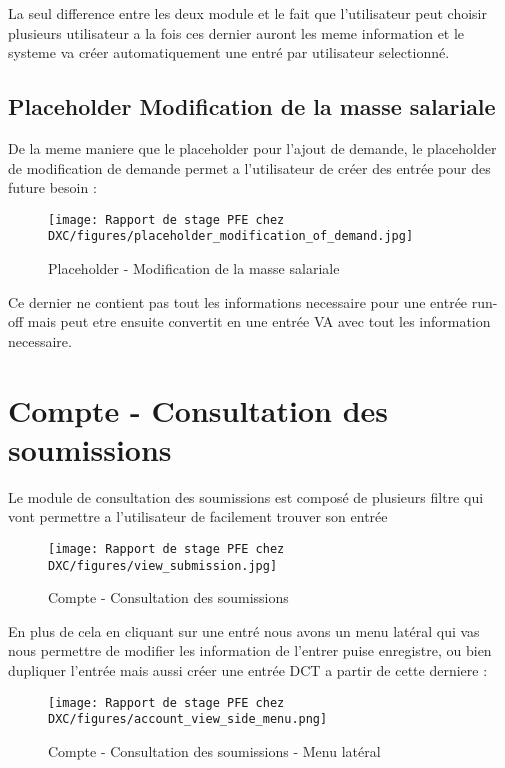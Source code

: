 La seul difference entre les deux module et le fait que l'utilisateur peut choisir plusieurs utilisateur a la fois ces dernier auront les meme information et le systeme va créer automatiquement une entré par utilisateur selectionné.

\newpage

\subsection{Placeholder Modification de la masse salariale}

De la meme maniere que le placeholder pour l'ajout de demande, le placeholder de modification de demande permet a l'utilisateur de créer des entrée pour des future besoin :

\begin{figure}[H]
    \centering
    \texttt{[image: Rapport de stage PFE chez DXC/figures/placeholder\_modification\_of\_demand.jpg]}
    \caption{Placeholder - Modification de la masse salariale}
\end{figure}

Ce dernier ne contient pas tout les informations necessaire pour une entrée run-off mais peut etre ensuite convertit en une entrée VA avec tout les information necessaire.

\newpage
\section{Compte - Consultation des soumissions}

Le module de consultation des soumissions est composé de plusieurs filtre qui vont permettre a l'utilisateur de facilement trouver son entrée 

\begin{figure}[H]
    \centering
    \texttt{[image: Rapport de stage PFE chez DXC/figures/view\_submission.jpg]}
    \caption{Compte - Consultation des soumissions}
\end{figure}

En plus de cela en cliquant sur une entré nous avons un menu latéral qui vas nous permettre de modifier les information de l'entrer puise enregistre, ou bien 
dupliquer l'entrée mais aussi créer une entrée DCT a partir de cette derniere :

\begin{figure}[H]
    \centering
    \texttt{[image: Rapport de stage PFE chez DXC/figures/account\_view\_side\_menu.png]}
    \caption{Compte - Consultation des soumissions - Menu latéral}
\end{figure}

